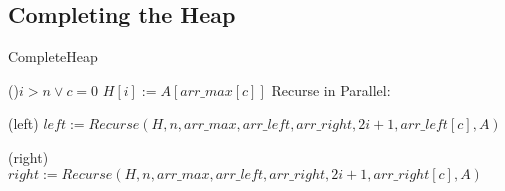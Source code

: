 \documentclass[letterpaper, reqno, 11pt]{article}
\begin{document}
\subsection*{Completing the Heap}
\begin{algorithm}[H]
\caption{CompleteHeap}
\If(){$i>n\lor c=0$}
{
	\;
}
$H[i]:=A[arr\_max[c]]$
Recurse in Parallel:
\begin{description}
	\item{(left)} $left:=Recurse(H, n, arr\_max, arr\_left, arr\_right,
			2i+1, arr\_left[c], A)$\;
	\item{(right)} $right:=Recurse(H, n, arr\_max, arr\_left, arr\_right,
			2i+1, arr\_right[c], A)$\;
\end{description}
\end{algorithm}
\end{document}
